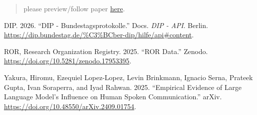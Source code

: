 \documentclass[
  letterpaper,
  DIV=11,
  numbers=noendperiod]{scrartcl}
\newlength{\cslhangindent}
\newenvironment{CSLReferences}[2] %
 {\begin{list}{}{%
  \setlength{\itemindent}{0pt}
  \setlength{\leftmargin}{0pt}
  \setlength{\parsep}{0pt}
  \ifodd #1
   \setlength{\leftmargin}{\cslhangindent}
   \setlength{\itemindent}{-1\cslhangindent}
  \fi
  \setlength{\itemsep}{#2\baselineskip}}}
 {\end{list}}
\begin{document}
\begin{quote}
please preview/follow paper \href{gemini.html}{here}.
\end{quote}

\label{refs}
\begin{CSLReferences}{1}{0}
DIP. 2026. {``{DIP} - {Bundestagsprotokolle}.''} Docs. \emph{DIP - API}.
Berlin.
\url{https://dip.bundestag.de/\%C3\%BCber-dip/hilfe/api\#content}.

ROR, Research Organization Registry. 2025. {``{ROR} {Data}.''} Zenodo.
\url{https://doi.org/10.5281/zenodo.17953395}.

Yakura, Hiromu, Ezequiel Lopez-Lopez, Levin Brinkmann, Ignacio Serna,
Prateek Gupta, Ivan Soraperra, and Iyad Rahwan. 2025. {``Empirical
Evidence of {Large} {Language} {Model}'s Influence on Human Spoken
Communication.''} arXiv.
\url{https://doi.org/10.48550/arXiv.2409.01754}.

\end{CSLReferences}
\end{document}
